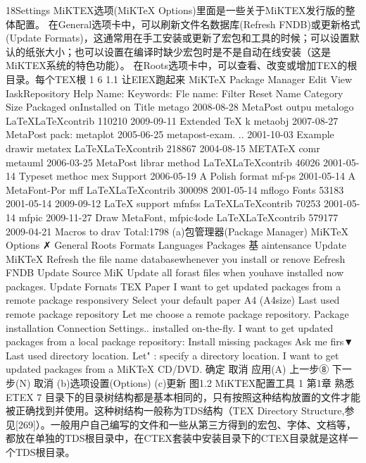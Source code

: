 \documentclass[UTF8]{ctexart}
\begin{document}
18Settings
MiKTEX选项(MiKTeX Options)里面是一些关于MiKTEX发行版的整体配置。
在General选项卡中，可以刷新文件名数据库(Refresh FNDB)或更新格式(Update Formats)，这通常用在手工安装或更新了宏包和工具的时候；可以设置默认的纸张大小；也可以设置在编译时缺少宏包时是不是自动在线安装（这是MiKTEX系统的特色功能）。
在Roots选项卡中，可以查看、改变或增加TEX的根目录。每个TEX根
1
6
1.1 让EIEX跑起来
MiKTeX Package Manager
Edit	View	IaskRepository Help
Name:	Keywords:	Fle name:	Filter	Reset
Name	Category	Size	Packaged onInstalled on	Title
metago	\Applications{}	2008-08-28	MetaPost outpu
metalogo	\Formats\LaTeX\LaTeX contrib	110210	2009-09-11	Extended TeX k
metaobj	\Applications{}	2007-08-27	MetaPost pack:
metaplot		2005-06-25
metapost-exam. .. 	2001-10-03	Example drawir
metatex	\Formats\LaTeX\LaTeX contrib	218867	2004-08-15	METATeX comr
metauml		2006-03-25	MetaPost librar
method	\Formats\LaTeX\LaTeX contrib	46026	2001-05-14	Typeset methoc
mex	\Language Support	2006-05-19	A Polish format
mf-ps	\Applications{}	2001-05-14	A MetaFont-Por
mff	\Formats\LaTeX\LaTeX contrib	300098	2001-05-14
mflogo	\Fonts\METAFONT Fonts	53183	2001-05-14	2009-09-12	LaTeX support
mfnfss	\Formats\LaTeX\LaTeX contrib	70253	2001-05-14
mfpic	\Applications{}	2009-11-27	Draw MetaFont,
mfpic4ode	\Formats\LaTeX\LaTeX contrib	579177	2009-04-21	Macros to drav
Total:1798
(a)包管理器(Package Manager)
MiKTeX Options
✗
General
Roots
Formats
Languages
Packages
基 aintensance
Update MiKTeX
Refresh the file name databasewhenever you install or renove
Eefresh FNDB
Update Source
MiK
Update all forast files when youhave installed now packages.
Update Fornats
TEX
Paper
I want to get updated packages from a remote package responsivery
Select your default paper
A4 (A4size)
Last used remote package repository
Let me choose a remote package repository.
Package installation
Connection Settings..
installed on-the-fly.
I want to get updated packages from a local package repository:
Install missing packages
Ask me firs▼
Last used directory location.
Let" : specify a directory location.
I want to get updated packages from a MiKTeX CD/DVD.
确定
取消
应用(A)
上一步⑧
下一步(N)
取消
(b)选项设置(Options)
(c)更新
图1.2 MiKTEX配置工具
1
第1章	熟悉ETEX	7
目录下的目录树结构都是基本相同的，只有按照这种结构放置的文件才能被正确找到并使用。这种树结构一般称为TDS结构（TEX Directory Structure,参见[269]）。一般用户自己编写的文件和一些从第三方得到的宏包、字体、文档等，都放在单独的TDS根目录中，在CTEX套装中安装目录下的CTEX目录就是这样一个TDS根目录。
\end{document}

